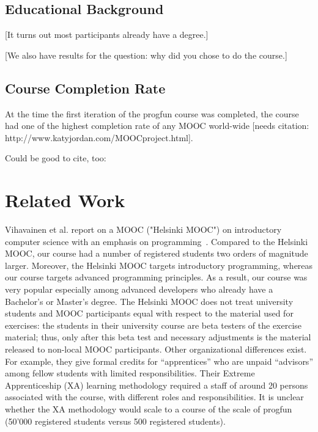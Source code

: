 \documentclass{sig-alternate}
\begin{document}
\subsection{Educational Background}

[It turns out most participants already have a degree.]

[We also have results for the question: why did you chose to do the course.]

\subsection{Course Completion Rate}

At the time the first iteration of the progfun course was completed, the
course had one of the highest completion rate of any MOOC world-wide [needs
citation: http://www.katyjordan.com/MOOCproject.html].

Could be good to cite, too:~\cite{Parr13}

\section{Related Work}

Vihavainen et al. report on a MOOC ("Helsinki MOOC") on introductory computer
science with an emphasis on programming~\cite{VihavainenLK12}. Compared to the
Helsinki MOOC, our course had a number of registered students two orders of
magnitude larger. Moreover, the Helsinki MOOC targets introductory
programming, whereas our course targets advanced programming principles. As a
result, our course was very popular especially among advanced developers who
already have a Bachelor's or Master's degree. The Helsinki MOOC does not treat
university students and MOOC participants equal with respect to the material
used for exercises: the students in their university course are beta testers
of the exercise material; thus, only after this beta test and necessary
adjustments is the material released to non-local MOOC participants. Other
organizational differences exist. For example, they give formal credits for
``apprentices'' who are unpaid ``advisors'' among fellow students with limited
responsibilities. Their Extreme Apprenticeship (XA) learning methodology
required a staff of around 20 persons associated with the course, with
different roles and responsibilities. It is unclear whether the XA methodology
would scale to a course of the scale of progfun (50'000 registered students
versus 500 registered students).


%

%
%
\end{document}
